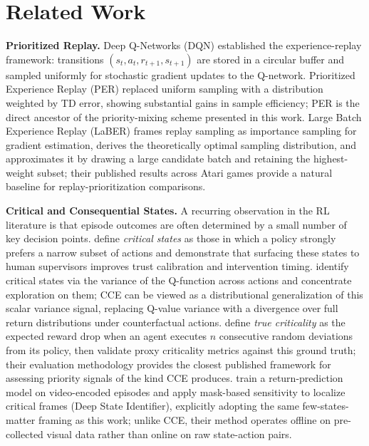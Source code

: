 \documentclass[conference]{IEEEtran}
\begin{document}
\section{Related Work}

\noindent\textbf{Prioritized Replay.}
Deep Q-Networks (DQN) \cite{mnih2013playingatarideepreinforcement} established the experience-replay framework: transitions $(s_t, a_t, r_{t+1}, s_{t+1})$ are stored in a circular buffer and sampled uniformly for stochastic gradient updates to the Q-network.
Prioritized Experience Replay (PER) \cite{schaul2016prioritizedexperiencereplay} replaced uniform sampling with a distribution weighted by TD error, showing substantial gains in sample efficiency; PER is the direct ancestor of the priority-mixing scheme presented in this work.
Large Batch Experience Replay (LaBER) \cite{lahire2022largebatch} frames replay sampling as importance sampling for gradient estimation, derives the theoretically optimal sampling distribution, and approximates it by drawing a large candidate batch and retaining the highest-weight subset; their published results across Atari games provide a natural baseline for replay-prioritization comparisons.

\noindent\textbf{Critical and Consequential States.}
A recurring observation in the RL literature is that episode outcomes are often determined by a small number of key decision points.
\cite{huang2018establishing} define \emph{critical states} as those in which a policy strongly prefers a narrow subset of actions and demonstrate that surfacing these states to human supervisors improves trust calibration and intervention timing.
\cite{karino2020identifying} identify critical states via the variance of the Q-function across actions and concentrate exploration on them; CCE can be viewed as a distributional generalization of this scalar variance signal, replacing Q-value variance with a divergence over full return distributions under counterfactual actions.
\cite{grushin2024criticality} define \emph{true criticality} as the expected reward drop when an agent executes $n$ consecutive random deviations from its policy, then validate proxy criticality metrics against this ground truth; their evaluation methodology provides the closest published framework for assessing priority signals of the kind CCE produces.
\cite{liu2023learning} train a return-prediction model on video-encoded episodes and apply mask-based sensitivity to localize critical frames (Deep State Identifier), explicitly adopting the same few-states-matter framing as this work; unlike CCE, their method operates offline on pre-collected visual data rather than online on raw state-action pairs.
\end{document}
